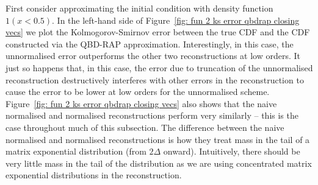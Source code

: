\begin{example}First consider approximating the initial condition with density function \(1(x<0.5)\). In the left-hand side of Figure~\ref{fig: fun 2 ks error qbdrap closing vecs} we plot the Kolmogorov-Smirnov error between the true CDF and the CDF constructed via the QBD-RAP approximation. Interestingly, in this case, the unnormalised error outperforms the other two reconstructions at low orders. It just so happens that, in this case, the error due to truncation of the unnormalised reconstruction destructively interferes with other errors in the reconstruction to cause the error to be lower at low orders for the unnormalised scheme. Figure~\ref{fig: fun 2 ks error qbdrap closing vecs} also shows that the naive normalised and normalised reconstructions perform very similarly -- this is the case throughout much of this subsection. The difference between the naive normalised and normalised reconstructions is how they treat mass in the tail of a matrix exponential distribution (from \(2\Delta\) onward). Intuitively, there should be very little mass in the tail of the distribution as we are using concentrated matrix exponential distributions in the reconstruction. 


\end{example}
